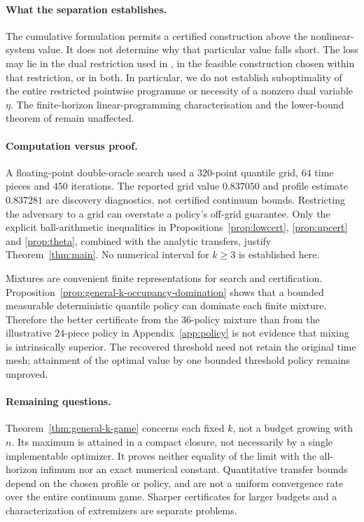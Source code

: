 \documentclass[11pt]{article}
\theoremstyle{remark}
\begin{document}
\paragraph{What the separation establishes.}
The cumulative formulation permits a certified construction above the nonlinear-system value. It does not determine why that particular value falls short. The loss may lie in the dual restriction used in \cite{BPV}, in the feasible construction chosen within that restriction, or in both. In particular, we do not establish suboptimality of the entire restricted pointwise programme or necessity of a nonzero dual variable $\eta$. The finite-horizon linear-programming characterisation and the lower-bound theorem of \cite{BPV} remain unaffected.

\paragraph{Computation versus proof.}
A floating-point double-oracle search used a $320$-point quantile grid, $64$ time pieces and $450$ iterations. The reported grid value $0.837050$ and profile estimate $0.837281$ are discovery diagnostics, not certified continuum bounds. Restricting the adversary to a grid can overstate a policy's off-grid guarantee. Only the explicit ball-arithmetic inequalities in Propositions~\ref{prop:lowcert}, \ref{prop:upcert} and \ref{prop:theta}, combined with the analytic transfers, justify Theorem~\ref{thm:main}. No numerical interval for $k\ge3$ is established here.

Mixtures are convenient finite representations for search and certification. Proposition~\ref{prop:general-k-occupancy-domination} shows that a bounded measurable deterministic quantile policy can dominate each finite mixture. Therefore the better certificate from the $36$-policy mixture than from the illustrative $24$-piece policy in Appendix~\ref{app:policy} is not evidence that mixing is intrinsically superior. The recovered threshold need not retain the original time mesh; attainment of the optimal value by one bounded threshold policy remains unproved.

\paragraph{Remaining questions.}
Theorem~\ref{thm:general-k-game} concerns each fixed $k$, not a budget growing with $n$. Its maximum is attained in a compact closure, not necessarily by a single implementable optimizer. It proves neither equality of the limit with the all-horizon infimum nor an exact numerical constant. Quantitative transfer bounds depend on the chosen profile or policy, and are not a uniform convergence rate over the entire continuum game. Sharper certificates for larger budgets and a characterization of extremizers are separate problems.
\end{document}
